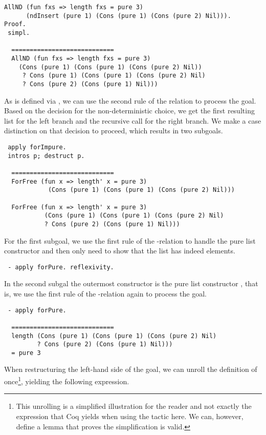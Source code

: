 \begin{verbatim}
AllND (fun fxs => length fxs = pure 3)
      (ndInsert (pure 1) (Cons (pure 1) (Cons (pure 2) Nil))).
Proof.
 simpl.

  ============================
  AllND (fun fxs => length fxs = pure 3)
    (Cons (pure 1) (Cons (pure 1) (Cons (pure 2) Nil))
     ? Cons (pure 1) (Cons (pure 1) (Cons (pure 2) Nil)
     ? Cons (pure 2) (Cons (pure 1) Nil)))
 \end{verbatim}

As  is defined via , we can use the second rule of the relation to process the goal.
Based on the decision for the non-deterministic choice, we get the first resulting list for the left branch and the recursive call for the right branch.
We make a case distinction on that decision to proceed, which results in two subgoals.

\begin{verbatim}
 apply forImpure.
 intros p; destruct p.

  ============================
  ForFree (fun x => length' x = pure 3)
            (Cons (pure 1) (Cons (pure 1) (Cons (pure 2) Nil)))

  ForFree (fun x => length' x = pure 3)
           (Cons (pure 1) (Cons (pure 1) (Cons (pure 2) Nil)
           ? Cons (pure 2) (Cons (pure 1) Nil)))
\end{verbatim}

For the first subgoal, we use the first rule of the -relation to handle the pure list constructor and then only need to show that the list has indeed  elements.

\begin{verbatim}
 - apply forPure. reflexivity.
\end{verbatim}

In the second subgal the outermost constructor is the pure list constructor , that is, we use the first rule of the -relation again to process the goal.

\begin{verbatim}
 - apply forPure.

  ============================
  length (Cons (pure 1) (Cons (pure 1) (Cons (pure 2) Nil)
         ? Cons (pure 2) (Cons (pure 1) Nil)))
  = pure 3
\end{verbatim}

When restructuring the left-hand side of the goal, we can unroll the definition of  once\footnote{This unrolling is a simplified illustration for the reader and not exactly the expression that Coq yields when using the tactic  here. We can, however, define a lemma that proves the simplification is valid.}, yielding the following expression.

